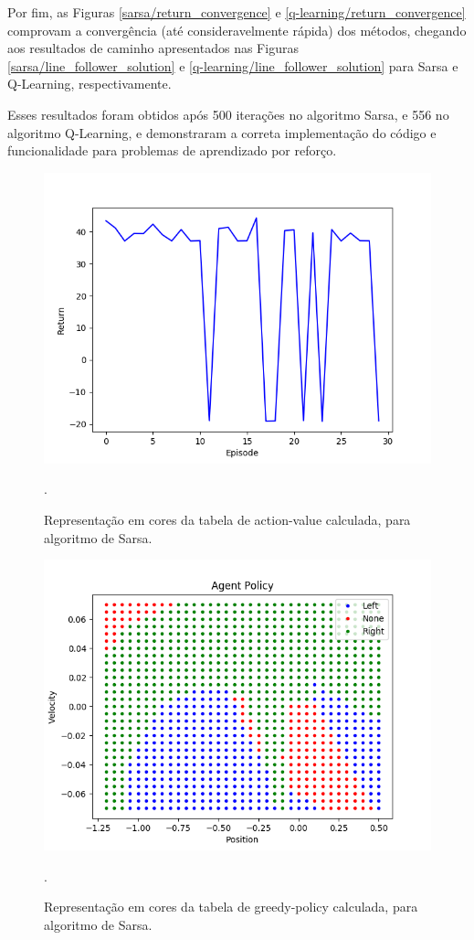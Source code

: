 \documentclass[conference]{IEEEtran}
\begin{document}
Por fim, as Figuras \ref{sarsa/return_convergence} e \ref{q-learning/return_convergence} comprovam a convergência (até consideravelmente rápida) dos métodos, chegando aos resultados de caminho apresentados nas Figuras \ref{sarsa/line_follower_solution} e \ref{q-learning/line_follower_solution} para Sarsa e Q-Learning, respectivamente.

Esses resultados foram obtidos após 500 iterações no algoritmo Sarsa, e 556 no algoritmo Q-Learning, e demonstraram a correta implementação do código e funcionalidade para problemas de aprendizado por reforço.

\begin{figure}[htbp]
\centering
\centerline{\includegraphics[scale=0.5]{imagens/dqn_evaluation.png}}
\caption{Representação em cores da tabela de action-value calculada, para algoritmo de Sarsa.}.
\label{dqn_evaluation}
\end{figure}

\begin{figure}[htbp]
\centering
\centerline{\includegraphics[scale=0.5]{imagens/agent_decision.png}}
\caption{Representação em cores da tabela de greedy-policy calculada, para algoritmo de Sarsa.}.
\label{agent_decision}
\end{figure} 
\end{document}
